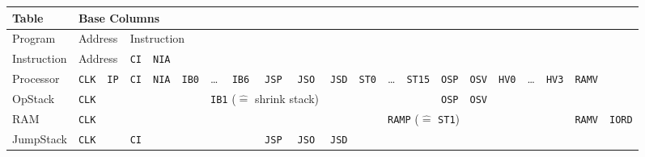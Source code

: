 \documentclass{article}
\begin{document}
\newpage
\begin{landscape}
\begin{tabular}{lllllllllllllllllllll}
    \toprule
    Table       & \multicolumn{5}{l}{Base Columns}                                        &       &              &              &                         &              &              &              &               &              &                      &              &                      &              &               &               \\ \midrule
    Program     & \multicolumn{2}{l}{Address} & \multicolumn{3}{l}{Instruction}           &       &              &              &                         &              &              &              &               &              &                      &              &                      &              &               &               \\
    Instruction & \multicolumn{2}{l}{Address} & \texttt{CI} & \texttt{NIA} &              &       &              &              &                         &              &              &              &               &              &                      &              &                      &              &               &               \\
    Processor   & \texttt{CLK} & \texttt{IP}  & \texttt{CI} & \texttt{NIA} & \texttt{IB0} & \dots & \texttt{IB6} & \texttt{JSP} & \texttt{JSO}            & \texttt{JSD} & \texttt{ST0} & \dots        & \texttt{ST15} & \texttt{OSP} & \texttt{OSV}         & \texttt{HV0} & \dots                & \texttt{HV3} & \texttt{RAMV} &               \\
    OpStack     & \texttt{CLK} &              &             &              &              & \multicolumn{4}{l}{\texttt{IB1} ($\widehat{=}$ shrink stack)} &              &              &              &               & \texttt{OSP} & \texttt{OSV}         &              &                      &              &               &               \\
    RAM         & \texttt{CLK} &              &             &              &              &       &              &              &                         &              &              & \multicolumn{4}{l}{\texttt{RAMP} ($\widehat{=}$ \texttt{ST1})}     &              &                      &              & \texttt{RAMV} & \texttt{IORD} \\
    JumpStack   & \texttt{CLK} &              & \texttt{CI} &              &              &       &              & \texttt{JSP} & \texttt{JSO}            & \texttt{JSD} &              &              &               &              &                      &              &                      &              &               &               \\

\end{tabular}
\end{landscape}
\end{document}
